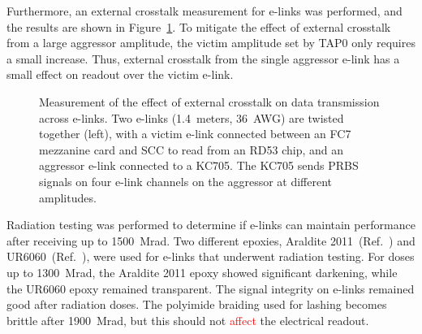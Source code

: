 \documentclass[a4paper,11pt]{article}
\newcommand{\mrad}{Mrad}
\newcommand{\fig}{Figure}
\newcommand{\red}{\textcolor{red}}
\begin{document}

Furthermore, an external crosstalk measurement for e-links was performed, and the results are shown in \fig~\ref{fig:external_crosstalk}.
To mitigate the effect of external crosstalk from a large aggressor amplitude, the victim amplitude set by TAP0 only requires a small increase.
Thus, external crosstalk from the single aggressor e-link has a small effect on readout over the victim e-link.

\begin{figure}[htbp]
\centering
{}
\hspace*{.2in}
\caption{
\label{fig:external_crosstalk}
Measurement of the effect of external crosstalk on data transmission across e-links.
Two e-links (1.4~meters, 36~AWG) are twisted together (left), with a victim e-link connected between an FC7 mezzanine card and SCC to read from an RD53 chip, and an aggressor e-link connected to a KC705.
The KC705 sends PRBS signals on four e-link channels on the aggressor at different amplitudes.
}
\end{figure}

Radiation testing was performed to determine if e-links can maintain performance after receiving up to 1500~\mrad.
Two different epoxies, Araldite 2011~(Ref.~\cite{ref:araldite}) and UR6060~(Ref.~\cite{ref:ur}), were used for e-links that underwent radiation testing.
For doses up to 1300~\mrad, the Araldite 2011 epoxy showed significant darkening, while the UR6060 epoxy remained transparent.
The signal integrity on e-links remained good after radiation doses.
The polyimide braiding used for lashing becomes brittle after 1900~\mrad, but this should not \red{affect} the electrical readout.
\end{document}
